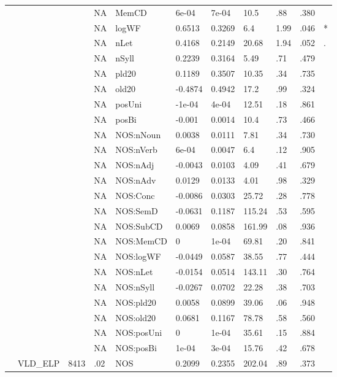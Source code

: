 \begin{table}[ht]
\begin{tabular}{lllllllllll}
   &  &  & NA & MemCD & 6e-04 & 7e-04 & 10.5 & .88 & .380 &   \\ 
   &  &  & NA & logWF & 0.6513 & 0.3269 & 6.4 & 1.99 & .046 & * \\ 
   &  &  & NA & nLet & 0.4168 & 0.2149 & 20.68 & 1.94 & .052 & . \\ 
   &  &  & NA & nSyll & 0.2239 & 0.3164 & 5.49 & .71 & .479 &   \\ 
   &  &  & NA & pld20 & 0.1189 & 0.3507 & 10.35 & .34 & .735 &   \\ 
   &  &  & NA & old20 & -0.4874 & 0.4942 & 17.2 & .99 & .324 &   \\ 
   &  &  & NA & posUni & -1e-04 & 4e-04 & 12.51 & .18 & .861 &   \\ 
   &  &  & NA & posBi & -0.001 & 0.0014 & 10.4 & .73 & .466 &   \\ 
   &  &  & NA & NOS:nNoun & 0.0038 & 0.0111 & 7.81 & .34 & .730 &   \\ 
   &  &  & NA & NOS:nVerb & 6e-04 & 0.0047 & 6.4 & .12 & .905 &   \\ 
   &  &  & NA & NOS:nAdj & -0.0043 & 0.0103 & 4.09 & .41 & .679 &   \\ 
   &  &  & NA & NOS:nAdv & 0.0129 & 0.0133 & 4.01 & .98 & .329 &   \\ 
   &  &  & NA & NOS:Conc & -0.0086 & 0.0303 & 25.72 & .28 & .778 &   \\ 
   &  &  & NA & NOS:SemD & -0.0631 & 0.1187 & 115.24 & .53 & .595 &   \\ 
   &  &  & NA & NOS:SubCD & 0.0069 & 0.0858 & 161.99 & .08 & .936 &   \\ 
   &  &  & NA & NOS:MemCD & 0 & 1e-04 & 69.81 & .20 & .841 &   \\ 
   &  &  & NA & NOS:logWF & -0.0449 & 0.0587 & 38.55 & .77 & .444 &   \\ 
   &  &  & NA & NOS:nLet & -0.0154 & 0.0514 & 143.11 & .30 & .764 &   \\ 
   &  &  & NA & NOS:nSyll & -0.0267 & 0.0702 & 22.28 & .38 & .703 &   \\ 
   &  &  & NA & NOS:pld20 & 0.0058 & 0.0899 & 39.06 & .06 & .948 &   \\ 
   &  &  & NA & NOS:old20 & 0.0681 & 0.1167 & 78.78 & .58 & .560 &   \\ 
   &  &  & NA & NOS:posUni & 0 & 1e-04 & 35.61 & .15 & .884 &   \\ 
   &  &  & NA & NOS:posBi & 1e-04 & 3e-04 & 15.76 & .42 & .678 &   \\ 
   & VLD\_ELP & 8413 & .02 & NOS & 0.2099 & 0.2355 & 202.04 & .89 & .373 &   \\ 

\end{tabular}
\end{table}
